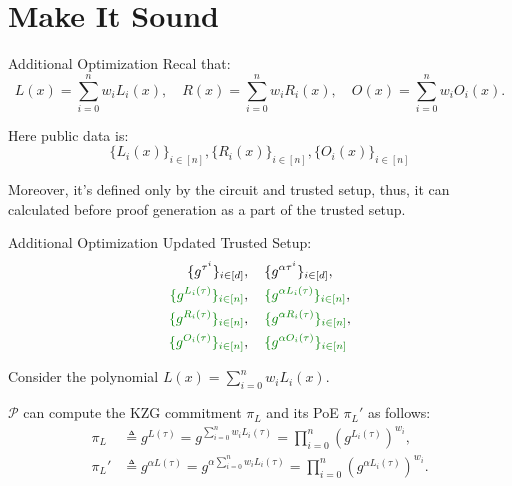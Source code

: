 \documentclass{zkdl-presentation-template}
\begin{document}
    \section{Make It Sound}

    \begin{frame}{Additional Optimization}
        Recal that:
        \begin{equation*}
            L(x) = \sum_{i=0}^n w_iL_i(x), \quad R(x) = \sum_{i=0}^n w_i R_i(x), \quad O(x) = \sum_{i=0}^n w_iO_i(x).
        \end{equation*}

        \pause

        Here public data is:
        \begin{equation*}
            \{L_i(x)\}_{i \in [n]}, \{R_i(x)\}_{i \in [n]}, \{O_i(x)\}_{i \in [n]}
        \end{equation*}

        \pause
        
        Moreover, it's defined only by the circuit and trusted setup, thus, it can calculated before proof generation as a part of the trusted setup.
    \end{frame}

    \begin{frame}{Additional Optimization}
        Updated Trusted Setup:
        \vspace{-10pt}
        {\scriptsize \begin{align*}
            \{g^{\tau^i}\}_{i \in [d]}&, \quad \{g^{\alpha \tau^i}\}_{i \in [d]}, \\
            \textcolor{green!50!black}{\{g^{L_i(\tau)}\}_{i \in [n]}}&, \quad \textcolor{green!50!black}{\{g^{\alpha L_i(\tau)}\}_{i \in [n]}},\\ 
            \textcolor{green!50!black}{\{g^{R_i(\tau)}\}_{i \in [n]}}&, \quad \textcolor{green!50!black}{\{g^{\alpha R_i(\tau)}\}_{i \in [n]}},\\
            \textcolor{green!50!black}{\{g^{O_i(\tau)}\}_{i \in [n]}}&, \quad \textcolor{green!50!black}{\{g^{\alpha O_i(\tau)}\}_{i \in [n]}}  
        \end{align*}}
       
        \pause
        
        Consider the polynomial $L(x) = \sum_{i=0}^n w_iL_i(x)$. 
        
        \pause
        
        $\mathcal{P}$ can compute the KZG commitment $\pi_L$ and its PoE $\pi_L'$ as follows:
        \begin{align*}
            \pi_L &\triangleq g^{L(\tau)} = g^{\sum_{i=0}^n w_i L_i(\tau)} = \prod_{i=0}^n (g^{L_i(\tau)})^{w_i}, \\
            \pi_L' &\triangleq g^{\alpha L(\tau)} = g^{\alpha \sum_{i=0}^n w_i L_i(\tau)} = \prod_{i=0}^n (g^{\alpha L_i(\tau)})^{w_i}.
        \end{align*}
    \end{frame}
\end{document}
